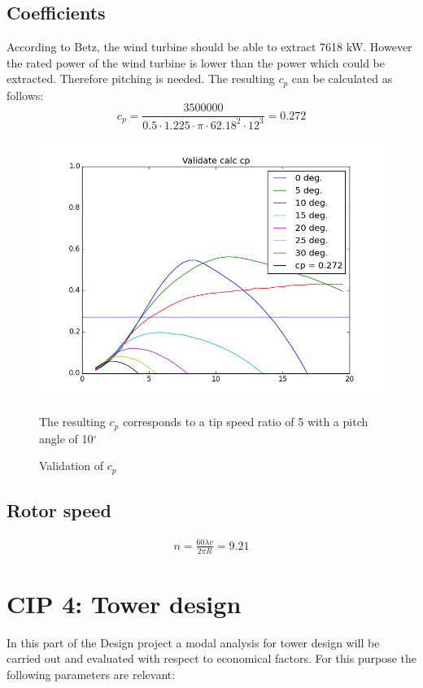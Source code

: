 \documentclass[10pt]{article}
\begin{document}
\subsection{Coefficients}
According to Betz, the wind turbine should be able to extract 7618 kW.
However the rated power of the wind turbine is lower than the power which could be extracted. Therefore pitching is needed. The resulting $c_p$ can be calculated as follows:
\begin{equation}
c_p = \frac{3500000}{0.5 \cdot 1.225 \cdot \pi\cdot  62.18^2 \cdot  12^3} = 0.272
\end{equation}

\begin{figure}[H]
\centering
\includegraphics[width=1\linewidth]{../CIP_3/WT_Perf/Output/validated_cp.png}
\caption{Validation of $c_p$}
\label{fig:validate}
The resulting $c_p$ corresponds to a tip speed ratio of 5 with a pitch angle of 10$^\circ$
\end{figure} 
\subsection{Rotor speed}
\begin{align*}
n = \frac{60 \lambda v}{2 \pi R} = 9.21
\end{align*}
\newpage
\section{CIP 4: Tower design}

In this part of the Design project a modal analysis for tower design will be carried out and evaluated with respect to economical factors. For this purpose the following parameters are relevant:
\end{document}
